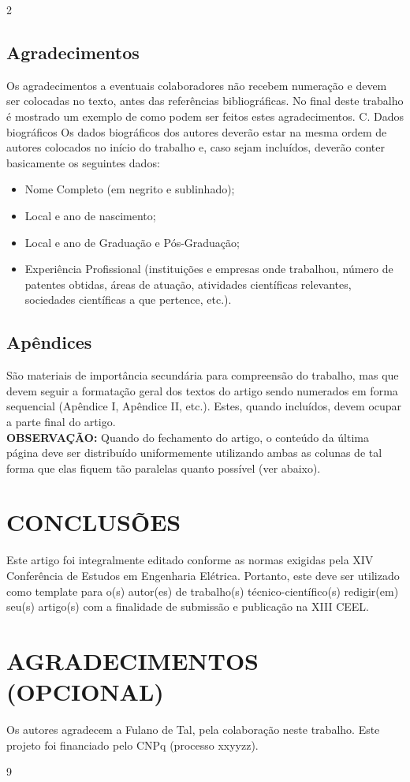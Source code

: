 \documentclass{ceel}
\begin{document}
\begin{multicols}{2}
\subsection{Agradecimentos}
Os agradecimentos a eventuais colaboradores não recebem numeração e devem ser colocadas no texto, antes das referências bibliográficas. No final deste trabalho é mostrado um exemplo de como podem ser feitos estes agradecimentos.
C. Dados biográficos
Os dados biográficos dos autores deverão estar na mesma ordem de autores colocados no início do trabalho e, caso sejam incluídos, deverão conter basicamente os seguintes dados:
\begin{itemize}
\item Nome Completo (em negrito e sublinhado);
\item	Local e ano de nascimento;
\item	Local e ano de Graduação e Pós-Graduação;
\item	Experiência Profissional (instituições e empresas onde trabalhou, número de patentes obtidas, áreas de atuação, atividades científicas relevantes, sociedades científicas a que pertence, etc.).
\end{itemize}
\subsection{Apêndices}
São materiais de importância secundária para compreensão do trabalho, mas que devem seguir a formatação geral dos textos do artigo sendo numerados em forma sequencial (Apêndice I, Apêndice II, etc.). Estes, quando incluídos, devem ocupar a parte final do artigo.\\

\textbf{OBSERVAÇÃO: }Quando do fechamento do artigo, o conteúdo da última página deve ser distribuído uniformemente utilizando ambas as colunas de tal forma que elas fiquem tão paralelas quanto possível (ver abaixo).
\section{CONCLUSÕES}
Este artigo foi integralmente editado conforme as normas exigidas pela XIV Conferência de Estudos em Engenharia Elétrica. Portanto, este deve ser utilizado como template para o(s) autor(es) de trabalho(s) técnico-científico(s) redigir(em) seu(s) artigo(s) com a finalidade de submissão e publicação na XIII CEEL.
\section*{ AGRADECIMENTOS (OPCIONAL)}
Os autores agradecem a Fulano de Tal, pela colaboração neste trabalho. Este projeto foi financiado pelo CNPq (processo xxyyzz).
\begin{thebibliography}{9} %


\end{thebibliography}
\end{multicols}
\end{document}
